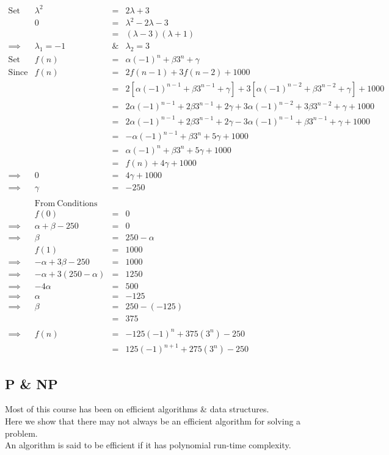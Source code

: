 \documentclass[11pt,a4paper]{article}
\begin{document}
\[\begin{array}{rrcl}
\mathrm{Set}& \lambda^2&=&2\lambda + 3\\
&0&=&\lambda^2-2\lambda-3\\
&&=&(\lambda-3)(\lambda+1)\\
\implies&\lambda_1=-1&\&&\lambda_2=3\\
\mathrm{Set}& f(n)&=&\alpha(-1)^n+\beta3^n+\gamma\\
\mathrm{Since}& f(n)&=&2f(n-1)+3f(n-2)+1000\\
&&=&2[\alpha(-1)^{n-1}+\beta3^{n-1}+\gamma] + 3[\alpha(-1)^{n-2}+\beta3^{n-2}+\gamma]+1000\\
&&=&2\alpha(-1)^{n-1}+2\beta3^{n-1}+2\gamma+3\alpha(-1)^{n-2}+3\beta3^{n-2}+\gamma+1000\\
&&=&2\alpha(-1)^{n-1}+2\beta3^{n-1}+2\gamma-3\alpha(-1)^{n-1}+\beta3^{n-1}+\gamma+1000\\
&&=&-\alpha(-1)^{n-1}+\beta3^n+5\gamma+1000\\
&&=&\alpha(-1)^n+\beta3^n+5\gamma+1000\\
&&=&f(n)+4\gamma+1000\\
\implies&0&=&4\gamma+1000\\
\implies&\gamma&=&-250\\
\\
&\mathrm{From\ Conditions}\\
&f(0)&=&0\\
\implies& \alpha+\beta-250&=&0\\
\implies& \beta&=&250-\alpha\\
&f(1)&=&1000\\
\implies& -\alpha+3\beta-250&=&1000\\
\implies&-\alpha+3(250-\alpha)&=&1250\\
\implies& -4\alpha&=&500\\
\implies& \alpha&=&-125\\
\implies& \beta&=&250-(-125)\\
&&=&375\\
\\
\implies& f(n)&=&-125(-1)^n+375(3^n)-250\\
&&=&125(-1)^{n+1}+275(3^n)-250
\end{array}\]

\subsection{P \& NP}

Most of this course has been on efficient algorithms \& data structures.\\
Here we show that there may not always be an efficient algorithm for solving a problem.\\
\nb An algorithm is said to be efficient if it has polynomial run-time complexity.\\
\end{document}
